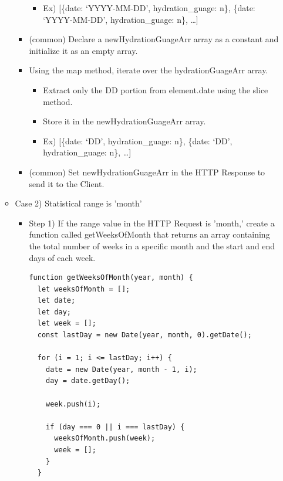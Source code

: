 \documentclass[conference]{IEEEtran}
\begin{document}
\begin{itemize}
\begin{itemize}
\begin{itemize}
\begin{itemize}
                \item Ex) [\{date: ‘YYYY-MM-DD’, hydration\_guage: n\}, \{date: ‘YYYY-MM-DD’, hydration\_guage: n\}, …]
            \end{itemize}
            \item (common) Declare a newHydrationGuageArr array as a constant and initialize it as an empty array.
            \item Using the map method, iterate over the hydrationGuageArr array.
            \begin{itemize}
                \item Extract only the DD portion from element.date using the slice method.
                \item Store it in the newHydrationGuageArr array.
                \item Ex) [\{date: ‘DD’, hydration\_guage: n\}, \{date: ‘DD’, hydration\_guage: n\}, …]
            \end{itemize}
            \item (common) Set newHydrationGuageArr in the HTTP Response to send it to the Client.
            \\
        \end{itemize}
        \item Case 2) Statistical range is 'month' 
        \begin{itemize}
            \item Step 1) If the range value in the HTTP Request is 'month,' create a function called getWeeksOfMonth that returns an array containing the total number of weeks in a specific month and the start and end days of each week. 
            \begin{lstlisting}[style=htmlcssjs]
function getWeeksOfMonth(year, month) {
  let weeksOfMonth = [];
  let date;
  let day;
  let week = [];
  const lastDay = new Date(year, month, 0).getDate();

  for (i = 1; i <= lastDay; i++) {
    date = new Date(year, month - 1, i);
    day = date.getDay();

    week.push(i);

    if (day === 0 || i === lastDay) {
      weeksOfMonth.push(week);
      week = [];
    }
  }


\end{lstlisting}
\end{itemize}
\end{itemize}
\end{itemize}
\end{document}
